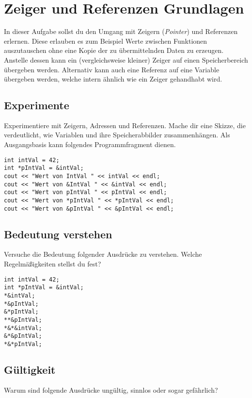 \section{Zeiger und Referenzen Grundlagen}
In dieser Aufgabe sollst du den Umgang mit Zeigern (\emph{Pointer}) und Referenzen erlernen.
Diese erlauben es zum Beispiel Werte zwischen Funktionen auszutauschen ohne eine Kopie der zu übermittelnden Daten zu erzeugen.
Anstelle dessen kann ein (vergleichsweise kleiner) Zeiger auf einen Speicherbereich übergeben werden.
Alternativ kann auch eine Referenz auf eine Variable übergeben werden, welche intern ähnlich wie ein Zeiger gehandhabt wird.

\subsection{Experimente}
Experimentiere mit Zeigern, Adressen und Referenzen.
Mache dir eine Skizze, die verdeutlicht, wie Variablen und ihre Speicherabbilder zusammenhängen.
Als Ausgangsbasis kann folgendes Programmfragment dienen.

\begin{lstlisting}
int intVal = 42;
int *pIntVal = &intVal;
cout << "Wert von IntVal " << intVal << endl;
cout << "Wert von &IntVal " << &intVal << endl;
cout << "Wert von pIntVal " << pIntVal << endl;
cout << "Wert von *pIntVal " << *pIntVal << endl;
cout << "Wert von &pIntVal " << &pIntVal << endl;
\end{lstlisting}

\subsection{Bedeutung verstehen}
Versuche die Bedeutung folgender Ausdrücke zu verstehen.
Welche Regelmäßigkeiten stellst du fest?

\begin{lstlisting}
int intVal = 42;
int *pIntVal = &intVal;
*&intVal;
*&pIntVal;
&*pIntVal;
**&pIntVal;
*&*&intVal;
&*&pIntVal;
*&*pIntVal;
\end{lstlisting}



\subsection{Gültigkeit}
Warum sind folgende Ausdrücke ungültig, sinnlos oder sogar gefährlich?

